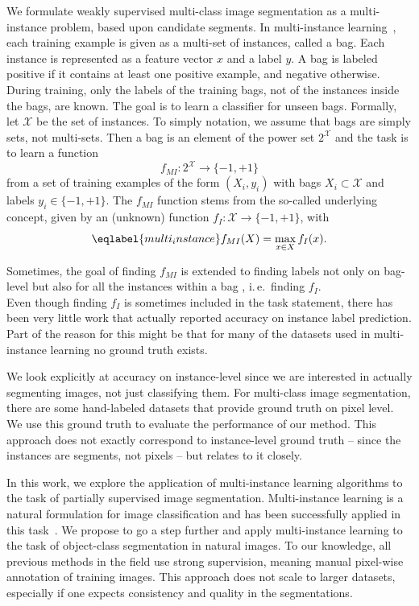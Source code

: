 We formulate weakly supervised multi-class image segmentation as a multi-instance problem, based upon candidate segments.
In multi-instance learning~\citep{dietterich1997solving}, each training example is given as a multi-set of instances, called a bag.
Each instance is represented as a feature vector $x$ and a label $y$.
A bag is labeled positive if it contains at least one positive example, and negative otherwise.
During training, only the labels of the training bags, not of the instances inside the bags, are known.
The goal is to learn a classifier for unseen bags. 
Formally, let $\mathcal{X}$ be the set of instances. To simply notation, we assume that bags are simply sets, not multi-sets.
Then a bag is an element of the power set $2^\mathcal{X}$ and the task is
to learn a function
\begin{equation} f_{MI} \colon 2^\mathcal{X} \rightarrow \{-1,+1\}  \end{equation}
from a set of training examples of the form $(X_i,y_i)$ with bags $X_i \subset \mathcal{X}$ and labels $y_i \in \{-1,+1\}$.
The $f_{MI}$ function stems from the so-called underlying concept, given by an (unknown) function
$f_{I} \colon \mathcal{X} \rightarrow \{-1,+1\}$, with 
\begin{equation}\eqlabel{multi_instance}
f_{MI}(X)= \max_{x \in X} f_{I}(x).
\end{equation}

Sometimes, the goal of finding $f_{MI}$ is extended to finding labels not only
on bag-level but also for all the instances within a bag
\citep{liconvex2010,zha2008joint}, i.\,e.\ finding $f_{I}$.\\ 
Even though finding $f_{I}$ is sometimes included in the task statement, there
has been very little work that actually reported accuracy on instance label prediction. Part
of the reason for this might be that for many of the datasets used in
multi-instance learning no ground truth exists.

We look explicitly at accuracy on instance-level since we are interested in
actually segmenting images, not just classifying them. For multi-class image
segmentation, there are some hand-labeled datasets that provide ground truth
on pixel level. We use this ground truth to evaluate the performance of our
method. This approach does not exactly correspond to instance-level ground truth --
since the instances are segments, not pixels -- but relates to it closely.


In this work, we explore the 
application of multi-instance learning algorithms to the task of partially supervised image segmentation.
Multi-instance learning is a natural formulation for image classification and has been
successfully applied in this task~\citep{zhou2007multi}. We propose to go a step further and apply
multi-instance learning to the task of object-class segmentation in natural
images. To our knowledge, all previous
methods in the field use strong supervision, meaning manual pixel-wise annotation of
training images. This approach does not
scale to larger datasets, especially if one expects consistency and quality
in the segmentations.

